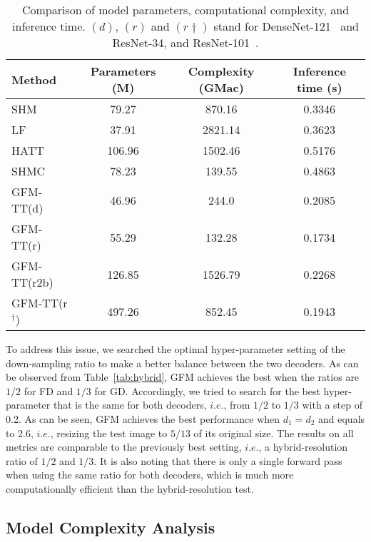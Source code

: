 \documentclass[twocolumn]{svjour3}
\begin{document}
\begin{table*}[htb]
\caption{Comparison of model parameters, computational complexity, and inference time. $(d)$, $(r)$ and $(r\dag)$ stand for DenseNet-121~\citep{huang2017densely} and ResNet-34, and ResNet-101~\citep{he2016deep}.}
\begin{center}
\begin{tabular}{l|ccc}
\hline
Method & Parameters (M) & Complexity (GMac) & Inference time (s)  \\
\hline
 SHM~\citep{chen2018semantic} & 79.27 &870.16 & 0.3346\\
 LF~\citep{zhang2019late} &37.91  & 2821.14& 0.3623\\
 HATT~\citep{Qiao_2020_CVPR} &106.96 &1502.46 & 0.5176\\
 SHMC~\citep{liu2020boosting} &78.23 &139.55 &0.4863 \\
 GFM-TT(d) & 46.96  & 244.0& 0.2085\\
 GFM-TT(r) & 55.29  & 132.28 & 0.1734\\
 GFM-TT(r2b) & 126.85  & 1526.79 &0.2268\\
 GFM-TT(r$^\dag$) & 497.26& 852.45& 0.1943\\
\hline
\end{tabular}
\end{center}
\label{Tab:run_time_parameters}
\end{table*}

To address this issue, we searched the optimal hyper-parameter setting of the down-sampling ratio to make a better balance between the two decoders. As can be observed from Table~\ref{tab:hybrid}, GFM achieves the best when the ratios are $1/2$ for FD and $1/3$ for GD. Accordingly, we tried to search for the best hyper-parameter that is the same for both decoders, $i.e.$, from $1/2$ to $1/3$ with a step of 0.2. As can be seen, GFM achieves the best performance when $d_1=d_2$ and equals to 2.6, $i.e.$, resizing the test image to $5/13$ of its original size. The results on all metrics are comparable to the previously best setting, $i.e.$, a hybrid-resolution ratio of $1/2$ and $1/3$. It is also noting that there is only a single forward pass when using the same ratio for both decoders, which is much more computationally efficient than the hybrid-resolution test.


\subsection{Model Complexity Analysis}
\label{sec: complexity}
\end{document}
